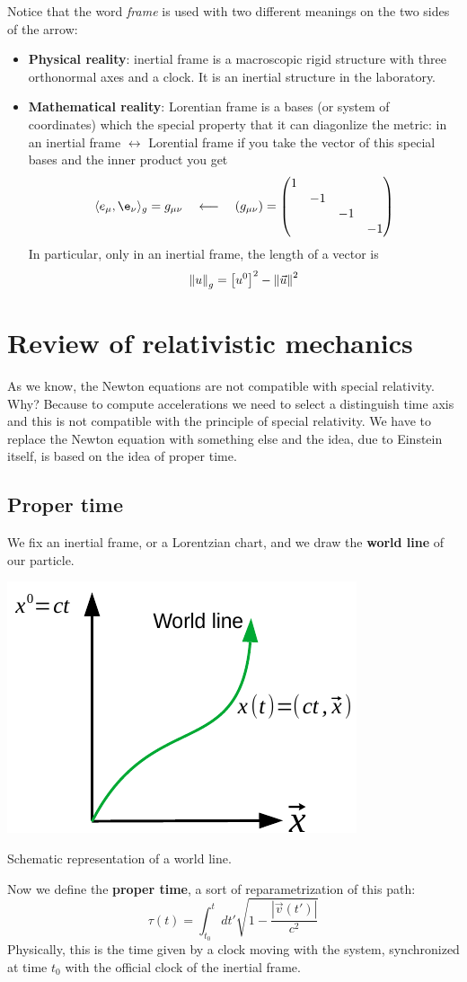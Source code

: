 \documentclass[../main.tex]{subfiles}
\begin{document}
Notice that the word \textit{frame} is used with two different meanings on the two sides of the arrow:
\begin{itemize}
    \item \textbf{Physical reality}: inertial frame is a macroscopic rigid structure with three orthonormal axes and a clock. It is an inertial structure in the laboratory.
    \item \textbf{Mathematical reality}: Lorentian frame is a bases (or system of coordinates) which the special property that it can diagonlize the metric: in an inertial frame $\leftrightarrow$ Lorential frame if you take the vector of this special bases and the inner product you get
    \[
    \langle e_\mu, \e_\nu \rangle_g = g_{\mu\nu} \quad \longleftarrow \quad\pqty{g_{\mu\nu}}=\mqty(\dmat{1,-1,-1,-1})
    \]
    In particular, only in an inertial frame, the length of a vector is
    \[
    \norm{u}_g=\bqty{u^0}^2-\norm{\vec{u}}^2
    \]
\end{itemize}
\section{Review of relativistic mechanics}
As we know, the Newton equations are not compatible with special relativity. Why? Because to compute accelerations we need to select a distinguish time axis and this is not compatible with the principle of special relativity. We have to replace the Newton equation with something else and the idea, due to Einstein itself, is based on the idea of proper time.
\subsection{Proper time}
We fix an inertial frame, or a Lorentzian chart, and we draw the \textbf{world line} of our particle.
\begin{marginfigure}
    \centering
	\includegraphics[width=1\linewidth]{images/World_line.pdf}
	\caption{Schematic representation of a world line.}
\end{marginfigure}
Now we define the \textbf{proper time}, a sort of reparametrization of this path:  
\[
\tau(t)=\int_{t_0}^t dt'\sqrt{1-\frac{|\Vec{v}(t')|}{c^2}}
\]
Physically, this is the time given by a clock moving with the system, synchronized at time $t_0$ with the official clock of the inertial frame.
\end{document}
